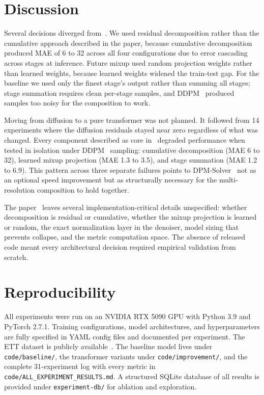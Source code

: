 \documentclass[conference]{IEEEtran}
\begin{document}
\section{Discussion}
Several decisions diverged from~\cite{mrdiff}. We used residual decomposition rather than the cumulative approach described in the paper, because cumulative decomposition produced MAE of 6 to 32 across all four configurations due to error cascading across stages at inference. Future mixup used random projection weights rather than learned weights, because learned weights widened the train-test gap. For the baseline we used only the finest stage's output rather than summing all stages; stage summation requires clean per-stage samples, and DDPM~\cite{ddpm} produced samples too noisy for the composition to work.

Moving from diffusion to a pure transformer was not planned. It followed from 14 experiments where the diffusion residuals stayed near zero regardless of what was changed. Every component described as core in~\cite{mrdiff} degraded performance when tested in isolation under DDPM~\cite{ddpm} sampling: cumulative decomposition (MAE 6 to 32), learned mixup projection (MAE 1.3 to 3.5), and stage summation (MAE 1.2 to 6.9). This pattern across three separate failures points to DPM-Solver~\cite{dpmsolver} not as an optional speed improvement but as structurally necessary for the multi-resolution composition to hold together.

The paper~\cite{mrdiff} leaves several implementation-critical details unspecified: whether decomposition is residual or cumulative, whether the mixup projection is learned or random, the exact normalization layer in the denoiser, model sizing that prevents collapse, and the metric computation space. The absence of released code meant every architectural decision required empirical validation from scratch.

\section{Reproducibility}
All experiments were run on an NVIDIA RTX 5090 GPU with Python 3.9 and PyTorch 2.7.1. Training configurations, model architectures, and hyperparameters are fully specified in YAML config files and documented per experiment. The ETT dataset is publicly available~\cite{informer}. The baseline model lives under \texttt{code/baseline/}, the transformer variants under \texttt{code/improvement/}, and the complete 31-experiment log with every metric in \texttt{code/ALL\_EXPERIMENT\_RESULTS.md}. A structured SQLite database of all results is provided under \texttt{experiment-db/} for ablation and exploration.
\end{document}
